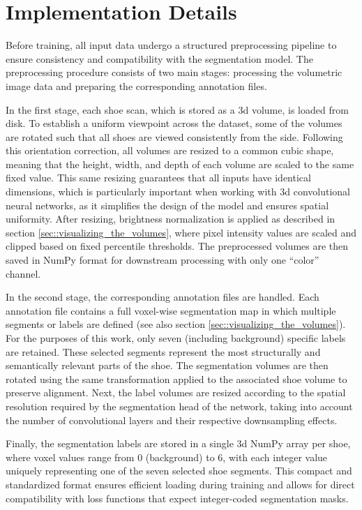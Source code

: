 \section{Implementation Details}
Before training, all input data undergo a structured preprocessing pipeline to ensure consistency and compatibility with the segmentation model. The preprocessing procedure consists of two main stages: processing the volumetric image data and preparing the corresponding annotation files.

\medskip

In the first stage, each shoe scan, which is stored as a \gls{3d} volume, is loaded from disk. To establish a uniform viewpoint across the dataset, some of the volumes are rotated such that all shoes are viewed consistently from the side. Following this orientation correction, all volumes are resized to a common cubic shape, meaning that the height, width, and depth of each volume are scaled to the same fixed value. This same resizing guarantees that all inputs have identical dimensions, which is particularly important when working with \gls{3d} convolutional neural networks, as it simplifies the design of the model and ensures spatial uniformity. After resizing, brightness normalization is applied as described in section \ref{sec::visualizing_the_volumes}, where pixel intensity values are scaled and clipped based on fixed percentile thresholds. The preprocessed volumes are then saved in NumPy format for downstream processing with only one \enquote{color} channel.

\medskip

In the second stage, the corresponding annotation files are handled. Each annotation file contains a full voxel-wise segmentation map in which multiple segments or labels are defined (see also section \ref{sec::visualizing_the_volumes}). For the purposes of this work, only seven (including background) specific labels are retained. These selected segments represent the most structurally and semantically relevant parts of the shoe. The segmentation volumes are then rotated using the same transformation applied to the associated shoe volume to preserve alignment. Next, the label volumes are resized according to the spatial resolution required by the segmentation head of the network, taking into account the number of convolutional layers and their respective downsampling effects.

\medskip

Finally, the segmentation labels are stored in a single \gls{3d} NumPy array per shoe, where voxel values range from 0 (background) to 6, with each integer value uniquely representing one of the seven selected shoe segments. This compact and standardized format ensures efficient loading during training and allows for direct compatibility with loss functions that expect integer-coded segmentation masks.

